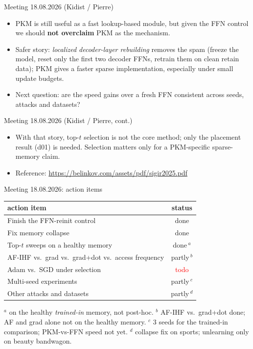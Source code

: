 \documentclass{beamer}
\newcommand{\stdone}{\textcolor{green!50!black}{done}}
\newcommand{\sttodo}{\textcolor{red}{todo}}
\begin{document}
\begin{frame}{Meeting 18.08.2026 (Kidist / Pierre)}
\begin{itemize}
  \item PKM is still useful as a fast lookup-based module, but given the FFN
        control we should \textbf{not overclaim} PKM as the mechanism.
  \item Safer story: \emph{localized decoder-layer rebuilding} removes the spam
        (freeze the model, reset only the first two decoder FFNs, retrain them
        on clean retain data); PKM gives a faster sparse implementation,
        especially under small update budgets.
  \item Next question: are the speed gains over a fresh FFN consistent across
        seeds, attacks and datasets?
\end{itemize}
\end{frame}

\begin{frame}{Meeting 18.08.2026 (Kidist / Pierre, cont.)}
\begin{itemize}
  \item With that story, top-$t$ selection is not the core method; only the
        placement result (d01) is needed. Selection matters only for a
        PKM-specific sparse-memory claim.
  \item Reference: \url{https://belinkov.com/assets/pdf/sigir2025.pdf}
\end{itemize}
\end{frame}

\begin{frame}{Meeting 18.08.2026: action items}
\begin{center}
\small
\begin{tabular}{|l|c|}
\hline
action item & status \\
\hline
Finish the FFN-reinit control                       & \stdone \\
Fix memory collapse                                 & \stdone \\
Top-$t$ sweeps on a healthy memory                  & \stdone\,$^{a}$ \\
AF-IHF vs.\ grad vs.\ grad+dot vs.\ access frequency & partly\,$^{b}$ \\
Adam vs.\ SGD under selection                       & \sttodo \\
Multi-seed experiments                              & partly\,$^{c}$ \\
Other attacks and datasets                          & partly\,$^{d}$ \\
\hline
\end{tabular}
\end{center}
{\footnotesize
$^{a}$ on the healthy \emph{trained-in} memory, not post-hoc.
$^{b}$ AF-IHF vs.\ grad+dot done; AF and grad alone not on the healthy memory.
$^{c}$ 3 seeds for the trained-in comparison; PKM-vs-FFN speed not yet.
$^{d}$ collapse fix on sports; unlearning only on beauty bandwagon.}
\end{frame}
\end{document}
